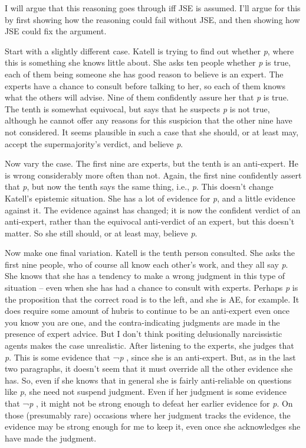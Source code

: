 \documentclass[
  10pt,
  letterpaper,
  twoside]{scrbook}
\begin{document}
I will argue that this reasoning goes through iff JSE is assumed. I'll
argue for this by first showing how the reasoning could fail without
JSE, and then showing how JSE could fix the argument.

Start with a slightly different case. {Katell} is trying to find out
whether \emph{p}, where this is something she knows little about. She
asks ten people whether \emph{p} is true, each of them being someone she
has good reason to believe is an expert. The experts have a chance to
consult before talking to her, so each of them knows what the others
will advise. Nine of them confidently assure her that \emph{p} is true.
The tenth is somewhat equivocal, but says that he suspects \emph{p} is
not true, although he cannot offer any reasons for this suspicion that
the other nine have not considered. It seems plausible in such a case
that she should, or at least may, accept the supermajority's verdict,
and believe \emph{p}.

Now vary the case. The first nine are experts, but the tenth is an
anti-expert. He is wrong considerably more often than not. Again, the
first nine confidently assert that \emph{p}, but now the tenth says the
same thing, i.e., \emph{p}. This doesn't change {Katell}'s epistemic
situation. She has a lot of evidence for \emph{p}, and a little evidence
against it. The evidence against has changed; it is now the confident
verdict of an anti-expert, rather than the equivocal anti-verdict of an
expert, but this doesn't matter. So she still should, or at least may,
believe \emph{p}.

Now make one final variation. {Katell} is the tenth person consulted.
She asks the first nine people, who of course all know each other's
work, and they all say \emph{p}. She knows that she has a tendency to
make a wrong judgment in this type of situation -- even when she has had
a chance to consult with experts. Perhaps \emph{p} is the proposition
that the correct road is to the left, and she is {AE}, for example. It
does require some amount of hubris to continue to be an anti-expert even
once you know you are one, and the contra-indicating judgments are made
in the presence of expert advice. But I don't think positing
delusionally narcissistic agents makes the case unrealistic. After
listening to the experts, she judges that \emph{p}. This is some
evidence that ¬\emph{p} , since she is an anti-expert. But, as in the
last two paragraphs, it doesn't seem that it must override all the other
evidence she has. So, even if she knows that in general she is fairly
anti-reliable on questions like \emph{p}, she need not suspend judgment.
Even if her judgment is some evidence that ¬\emph{p} , it might not be
strong enough to defeat her earlier evidence for \emph{p}. On those
(presumably rare) occasions where her judgment tracks the evidence, the
evidence may be strong enough for me to keep it, even once she
acknowledges she have made the judgment.
\end{document}
